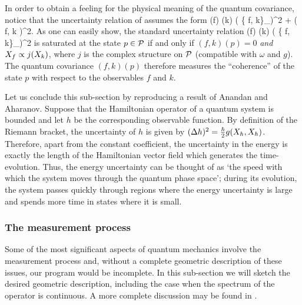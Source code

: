 In order to obtain a feeling for the physical meaning of the quantum
covariance, notice that the uncertainty relation of 
assumes the form
%
\be
(\Delta f) (\Delta k) \ge
\bigg(  \{ f, k\}_\w \bigg)^2 + ( f, k )^2.
\ee
%
As one can easily show, the standard uncertainty relation
%
\be
(\Delta f) (\Delta k) \ge
\bigg(  \{ f, k\}_\w \bigg)^2
\ee
%
is saturated at the state $p \in \P$ if and only if $(f, k)(p) = 0$
{\em and} $\hvf{f} \propto j(\hvf{k})$, where $j$ is the complex
structure on $\P$ (compatible with $\omega$ and $g$).  The quantum
covariance $(f, k)(p)$ therefore measures the ``coherence'' of the
state $p$ with respect to the observables $f$ and $k$.

Let us conclude this sub-section by reproducing a result of Anandan
and Aharanov\cite{anandan}. Suppose that the Hamiltonian operator of a
quantum system is bounded and let $h$ be the corresponding observable
function.  By definition of the Riemann bracket, the uncertainty of
$h$ is given by $(\Delta h)^2 = \frac{\hbar}{2} g(\hvf{h}, \hvf{h})$.
Therefore, apart from the constant coefficient, the uncertainty in the
energy is exactly the length of the Hamiltonian vector field which
generates the time-evolution. Thus, the energy uncertainty can be
thought of as `the speed with which the system moves through the
quantum phase space'; during its evolution, the system passes quickly
through regions where the energy uncertainty is large and spends more
time in states where it is small.


\subsubsection{The measurement process}

Some of the most significant aspects of quantum mechanics involve the
measurement process and, without a complete geometric description of
these issues, our program would be incomplete. In this sub-section we
will sketch the desired geometric description, including the case when
the spectrum of the operator is continuous. A more complete discussion
may be found in \cite{thesis}.

